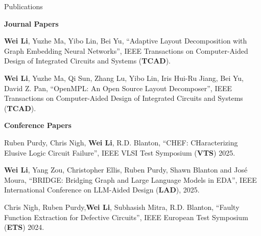 \newpage
\begin{rSection}{Publications}


    \textbf{Journal Papers}
    \begin{description}[font=\normalfont]
        \item[{[J2]}]{
            \textbf{Wei Li}, Yuzhe Ma, Yibo Lin, Bei Yu, 
            ``Adaptive Layout Decomposition with Graph Embedding Neural Networks'', IEEE Transactions on Computer-Aided Design of Integrated Circuits and Systems (\textbf{TCAD}).
        }
        \item[{[J1]}]{
            \textbf{Wei Li}, Yuzhe Ma, Qi Sun, Zhang Lu, Yibo Lin, Iris Hui-Ru Jiang, Bei Yu, David Z. Pan,
            ``OpenMPL: An Open Source Layout Decomposer'', IEEE Transactions on Computer-Aided Design of Integrated Circuits and Systems (\textbf{TCAD}).
        }
    \end{description}
\textbf{Conference Papers}
\begin{description}[font=\normalfont]
    \item[{[C16]}]{
        Ruben Purdy, Chris Nigh, \textbf{Wei Li}, R.D. Blanton, ``CHEF: CHaracterizing Elusive Logic Circuit Failure”, IEEE VLSI Test Symposium (\textbf{VTS}) 2025.
    }

    
    \item[{[C15]}]{
        \textbf{Wei Li}, Yang Zou, Christopher Ellis, Ruben Purdy, Shawn Blanton and José Moura,
        ``BRIDGE: Bridging Graph and Large Language Models in EDA'', IEEE International Conference on LLM-Aided Design (\textbf{LAD}), 2025.
    }

\item[{[C14]}]{
    Chris Nigh, Ruben Purdy,\textbf{Wei Li}, Subhasish Mitra, R.D. Blanton, ``Faulty Function Extraction for Defective Circuits”, IEEE European Test Symposium (\textbf{ETS}) 2024.
}



\end{description}
\end{rSection}
